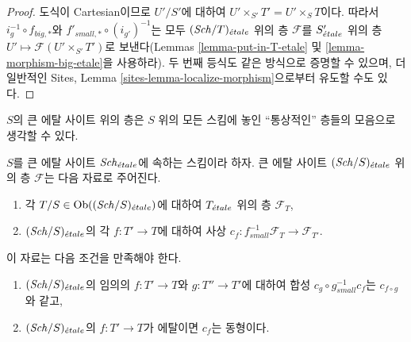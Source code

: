 \begin{proof}
도식이 Cartesian이므로 $U'/S'$에 대하여
$U' \times_{S'} T' = U' \times_S T$이다. 따라서
$i_g^{-1} \circ f_{big, *}$와 $f'_{small, *} \circ (i_{g'})^{-1}$는 모두
$(\mathit{Sch}/T)_{\acute{e}tale}$ 위의 층 $\mathcal{F}$를 $S'_{\acute{e}tale}$ 위의 층
$U' \mapsto \mathcal{F}(U' \times_{S'} T')$로 보낸다(Lemmas
\ref{lemma-put-in-T-etale} 및 \ref{lemma-morphism-big-etale}을 사용하라).
두 번째 등식도 같은 방식으로 증명할 수 있으며, 더 일반적인 Sites,
Lemma \ref{sites-lemma-localize-morphism}으로부터 유도할 수도 있다.
\end{proof}

\noindent
$S$의 큰 에탈 사이트 위의 층은 $S$ 위의 모든 스킴에 놓인
``통상적인'' 층들의 모음으로 생각할 수 있다.

\begin{lemma}
\label{lemma-characterize-sheaf-big-etale}
$S$를 큰 에탈 사이트 $\mathit{Sch}_{\acute{e}tale}$에 속하는 스킴이라 하자. 큰 에탈
사이트 $(\mathit{Sch}/S)_{\acute{e}tale}$ 위의 층 $\mathcal{F}$는 다음 자료로 주어진다.
\begin{enumerate}
\item 각 $T/S \in \mathop{\mathrm{Ob}}\nolimits((\mathit{Sch}/S)_{\acute{e}tale})$에 대하여 $T_{\acute{e}tale}$ 위의 층
$\mathcal{F}_T$,
\item $(\mathit{Sch}/S)_{\acute{e}tale}$의 각 $f : T' \to T$에 대하여 사상
$c_f : f_{small}^{-1}\mathcal{F}_T \to \mathcal{F}_{T'}$.
\end{enumerate}
이 자료는 다음 조건을 만족해야 한다.
\begin{enumerate}
\item[(a)] $(\mathit{Sch}/S)_{\acute{e}tale}$의 임의의 $f : T' \to T$와
$g : T'' \to T'$에 대하여 합성 $c_g \circ g_{small}^{-1}c_f$는
$c_{f \circ g}$와 같고,
\item[(b)] $(\mathit{Sch}/S)_{\acute{e}tale}$의 $f : T' \to T$가 에탈이면 $c_f$는
동형이다.
\end{enumerate}
\end{lemma}

